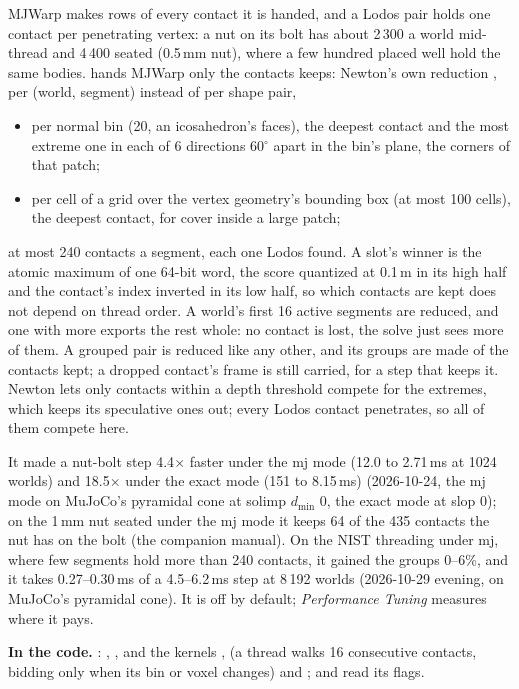MJWarp makes rows of every contact it is handed, and a Lodos pair holds one contact per penetrating vertex: a nut on its bolt has about 2\,300 a world mid-thread and 4\,400 seated (0.5\,mm nut), where a few hundred placed well hold the same bodies.  hands MJWarp only the contacts  keeps: Newton's own reduction \cite{newton}, per (world, segment) instead of per shape pair,
\begin{itemize}
\item per normal bin (20, an icosahedron's faces), the deepest contact and the most extreme one in each of 6 directions 60$^\circ$ apart in the bin's plane, the corners of that patch;
\item per cell of a grid over the vertex geometry's bounding box (at most 100 cells), the deepest contact, for cover inside a large patch;
\end{itemize}
at most 240 contacts a segment, each one Lodos found. A slot's winner is the atomic maximum of one 64-bit word, the score quantized at 0.1\,\micro m in its high half and the contact's index inverted in its low half, so which contacts are kept does not depend on thread order. A world's first 16 active segments are reduced, and one with more exports the rest whole: no contact is lost, the solve just sees more of them. A grouped pair is reduced like any other, and its groups are made of the contacts kept; a dropped contact's frame is still carried, for a step that keeps it. Newton lets only contacts within a depth threshold compete for the extremes, which keeps its speculative ones out; every Lodos contact penetrates, so all of them compete here.

It made a nut-bolt step 4.4$\times$ faster under the mj mode (12.0 to 2.71\,ms at 1024 worlds) and 18.5$\times$ under the exact mode (151 to 8.15\,ms) (2026-10-24, the mj mode on MuJoCo's pyramidal cone at solimp $d_{\min}$ 0, the exact mode at slop 0); on the 1\,mm nut seated under the mj mode it keeps 64 of the 435 contacts the nut has on the bolt (the companion manual). On the NIST threading under mj, where few segments hold more than 240 contacts, it gained the groups 0--6\%, and it takes 0.27--0.30\,ms of a 4.5--6.2\,ms step at 8\,192 worlds (2026-10-29 evening, on MuJoCo's pyramidal cone). It is off by default; \emph{Performance Tuning} measures where it pays.

\begin{codebox}
\textbf{In the code.} : , , and the kernels ,  (a thread walks 16 consecutive contacts, bidding only when its bin or voxel changes) and ;  and  read its  flags.
\end{codebox}

